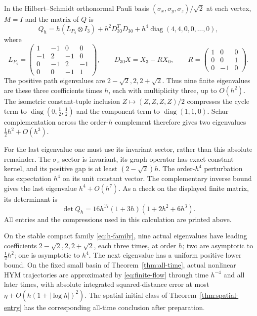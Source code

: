 In the Hilbert--Schmidt orthonormal Pauli basis
$(\sigma_x,\sigma_y,\sigma_z)/\sqrt2$ at each vertex,
$M=I$ and the matrix of $Q$ is
\begin{equation}\label{eq:h-matrix}
 Q_h=h(L_{P_4}\otimes I_3)+h^2D_{30}^TD_{30}
          +h^4\operatorname{diag}(4,4,0,0,\ldots,0),
\end{equation}
where
\[
 L_{P_4}=\begin{pmatrix}
 1&-1&0&0\\-1&2&-1&0\\0&-1&2&-1\\0&0&-1&1
 \end{pmatrix},\qquad
 D_{30}X=X_3-RX_0,\qquad
 R=\begin{pmatrix}1&0&0\\0&0&1\\0&-1&0\end{pmatrix}.
\]
The positive path eigenvalues are $2-\sqrt2,2,2+\sqrt2$.
Thus nine finite eigenvalues are these three coefficients
times $h$, each with multiplicity three, up to $O(h^2)$.
The isometric constant-tuple inclusion
$Z\mapsto(Z,Z,Z,Z)/2$ compresses the cycle term to
$\operatorname{diag}(0,\tfrac12,\tfrac12)$ and the
component term to $\operatorname{diag}(1,1,0)$.
Schur complementation across the order-$h$ complement
therefore gives two eigenvalues
$\tfrac12h^2+O(h^3)$.

For the last eigenvalue one must use its invariant sector,
rather than this absolute remainder. The $\sigma_x$
sector is invariant, its graph operator has exact
constant kernel, and its positive gap is at least
$(2-\sqrt2)h$. The order-$h^4$ perturbation has
expectation $h^4$ on its unit constant vector.
The complementary inverse bound gives the last
eigenvalue $h^4+O(h^7)$. As a check on the displayed
finite matrix, its determinant is
\begin{equation}\label{eq:h-determinant}
 \det Q_h=16h^{17}(1+3h)(1+2h^2+6h^3).
\end{equation}
All entries and the compressions used in this calculation
are printed above.

\begin{corollary}\label{cor:three-scales}
On the stable compact family \eqref{eq:h-family}, nine
actual eigenvalues have leading coefficients
$2-\sqrt2,2,2+\sqrt2$, each three times, at order $h$;
two are asymptotic to $\tfrac12h^2$; one is
asymptotic to $h^4$. The next eigenvalue has a uniform
positive lower bound. On the fixed small basin of
Theorem~\ref{thm:all-time}, actual nonlinear HYM
trajectories are approximated by
\eqref{eq:finite-flow} through time $h^{-4}$ and all
later times, with absolute integrated squared-distance
error at most
$\eta+O(h(1+|\log h|)^2)$. The spatial initial class
of Theorem~\ref{thm:spatial-entry} has the corresponding
all-time conclusion after preparation.
\end{corollary}

